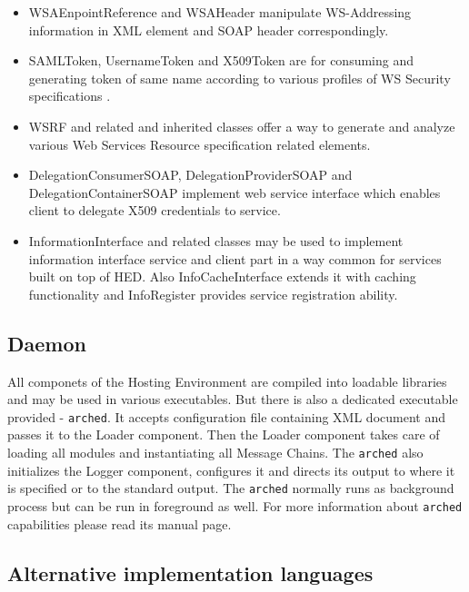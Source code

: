 \documentclass{book}
\begin{document}
\begin{itemize}

\item WSAEnpointReference and WSAHeader manipulate WS-Addressing \cite{ws-addr-soap} information in XML element and SOAP header correspondingly.

\item SAMLToken, UsernameToken and X509Token are for consuming and generating token of same name according to various profiles of WS Security specifications \cite{ws-security}.

\item WSRF and related and inherited classes offer a way to generate and analyze various Web Services Resource specification \cite{wsrf} related elements.

\item DelegationConsumerSOAP, DelegationProviderSOAP and DelegationContainerSOAP implement web service interface which enables client to delegate X509 credentials to service.

\item InformationInterface and related classes may be used to implement information interface service and client part in a way common for services built on top of HED. Also InfoCacheInterface extends it with caching functionality and InfoRegister provides service registration ability.

\end{itemize}


\subsection{Daemon}

All componets of the Hosting Environment are compiled into loadable libraries and may be used in various executables. But there is also a dedicated executable provided - \texttt{arched}. It accepts configuration file containing XML document and passes it to the Loader component. Then the Loader component takes care of loading all modules and instantiating all Message Chains. 
The \texttt{arched} also initializes the Logger component, configures it and directs its output to where it is specified or to the standard output. The \texttt{arched} normally runs as background process but can be run in foreground as well. 
For more information about \texttt{arched} capabilities please read its manual page.


\subsection{Alternative implementation languages}
\end{document}
